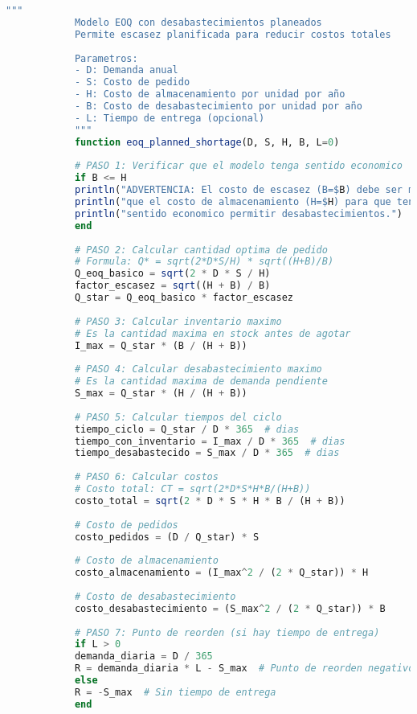 \documentclass[12pt,a4paper]{book}
\begin{document}
	\begin{tcolorbox}[enhanced,colback=verdeclaro,colframe=verdeprincipal,boxrule=3pt,arc=12pt,
		drop shadow,title={\Large\bfseries\color{white} \faExclamationTriangle\ EOQ CON ESCASEZ PLANEADA},breakable]
		
		\begin{lstlisting}[language=Julia,basicstyle=\footnotesize\ttfamily]
			"""
			Modelo EOQ con desabastecimientos planeados
			Permite escasez planificada para reducir costos totales
			
			Parametros:
			- D: Demanda anual
			- S: Costo de pedido
			- H: Costo de almacenamiento por unidad por año
			- B: Costo de desabastecimiento por unidad por año
			- L: Tiempo de entrega (opcional)
			"""
			function eoq_planned_shortage(D, S, H, B, L=0)
			
			# PASO 1: Verificar que el modelo tenga sentido economico
			if B <= H
			println("ADVERTENCIA: El costo de escasez (B=$B) debe ser mayor")
			println("que el costo de almacenamiento (H=$H) para que tenga")
			println("sentido economico permitir desabastecimientos.")
			end
			
			# PASO 2: Calcular cantidad optima de pedido
			# Formula: Q* = sqrt(2*D*S/H) * sqrt((H+B)/B)
			Q_eoq_basico = sqrt(2 * D * S / H)
			factor_escasez = sqrt((H + B) / B)
			Q_star = Q_eoq_basico * factor_escasez
			
			# PASO 3: Calcular inventario maximo
			# Es la cantidad maxima en stock antes de agotar
			I_max = Q_star * (B / (H + B))
			
			# PASO 4: Calcular desabastecimiento maximo
			# Es la cantidad maxima de demanda pendiente
			S_max = Q_star * (H / (H + B))
			
			# PASO 5: Calcular tiempos del ciclo
			tiempo_ciclo = Q_star / D * 365  # dias
			tiempo_con_inventario = I_max / D * 365  # dias
			tiempo_desabastecido = S_max / D * 365  # dias
			
			# PASO 6: Calcular costos
			# Costo total: CT = sqrt(2*D*S*H*B/(H+B))
			costo_total = sqrt(2 * D * S * H * B / (H + B))
			
			# Costo de pedidos
			costo_pedidos = (D / Q_star) * S
			
			# Costo de almacenamiento
			costo_almacenamiento = (I_max^2 / (2 * Q_star)) * H
			
			# Costo de desabastecimiento
			costo_desabastecimiento = (S_max^2 / (2 * Q_star)) * B
			
			# PASO 7: Punto de reorden (si hay tiempo de entrega)
			if L > 0
			demanda_diaria = D / 365
			R = demanda_diaria * L - S_max  # Punto de reorden negativo!
			else
			R = -S_max  # Sin tiempo de entrega
			end
			

\end{lstlisting}
\end{tcolorbox}
\end{document}
